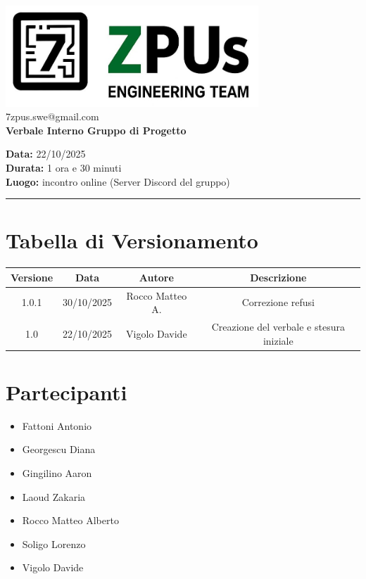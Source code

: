 \documentclass[a4paper,12pt]{article}
\begin{document}
\begin{center}
    \includegraphics[width=9.5cm]{../../../assets/logo7zpus.jpg}\\
    \small\hspace{10cm} 7zpus.swe@gmail.com\\
    \Large \textbf{Verbale Interno Gruppo di Progetto}\\
    \vspace{0.5cm}
\end{center}

\noindent
\textbf{Data:} 22/10/2025 \\
\textbf{Durata:} 1 ora e 30 minuti \\
\textbf{Luogo:} incontro online (Server Discord del gruppo)

\vspace{0.3cm}
\hrule
\vspace{0.5cm}

\tableofcontents

\newpage

\section*{Tabella di Versionamento}
    \begin{tabular}{|c|c|c|c|}
        \hline
        \textbf{Versione} & \textbf{Data} & \textbf{Autore} & \textbf{Descrizione} \\
        \hline
        1.0.1 & 30/10/2025 & Rocco Matteo A. & Correzione refusi \\
        \hline
        1.0 & 22/10/2025 & Vigolo Davide & Creazione del verbale e stesura iniziale \\
        \hline
    \end{tabular}


\section*{Partecipanti}
\begin{itemize}[noitemsep]
    \item Fattoni Antonio 
    \item Georgescu Diana
    \item Gingilino Aaron
    \item Laoud Zakaria
    \item Rocco Matteo Alberto
    \item Soligo Lorenzo
    \item Vigolo Davide
\end{itemize}
\end{document}
